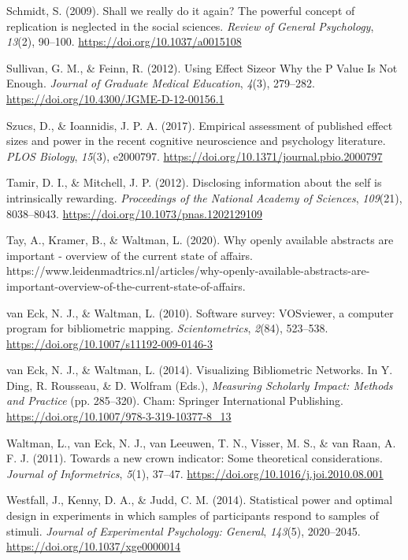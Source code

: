 \documentclass[
  man,floatsintext]{apa6}
\newlength{\cslhangindent}
\newlength{\cslentryspacingunit} %
\newenvironment{CSLReferences}[2] %
 {%
  \setlength{\parindent}{0pt}
  \ifodd #1
  \let\oldpar\par
  \def\par{\hangindent=\cslhangindent\oldpar}
  \fi
  \setlength{\parskip}{#2\cslentryspacingunit}
 }%
 {}
\begin{document}
\begin{CSLReferences}{1}{0}
\leavevmode{}%
Schmidt, S. (2009). Shall we really do it again? {The} powerful concept of replication is neglected in the social sciences. \emph{Review of General Psychology}, \emph{13}(2), 90--100. \url{https://doi.org/10.1037/a0015108}

\leavevmode{}%
Sullivan, G. M., \& Feinn, R. (2012). Using {Effect Size}\textemdash or {Why} the {P Value Is Not Enough}. \emph{Journal of Graduate Medical Education}, \emph{4}(3), 279--282. \url{https://doi.org/10.4300/JGME-D-12-00156.1}

\leavevmode{}%
Szucs, D., \& Ioannidis, J. P. A. (2017). Empirical assessment of published effect sizes and power in the recent cognitive neuroscience and psychology literature. \emph{PLOS Biology}, \emph{15}(3), e2000797. \url{https://doi.org/10.1371/journal.pbio.2000797}

\leavevmode{}%
Tamir, D. I., \& Mitchell, J. P. (2012). Disclosing information about the self is intrinsically rewarding. \emph{Proceedings of the National Academy of Sciences}, \emph{109}(21), 8038--8043. \url{https://doi.org/10.1073/pnas.1202129109}

\leavevmode{}%
Tay, A., Kramer, B., \& Waltman, L. (2020). Why openly available abstracts are important - overview of the current state of affairs. https://www.leidenmadtrics.nl/articles/why-openly-available-abstracts-are-important-overview-of-the-current-state-of-affairs.

\leavevmode{}%
van Eck, N. J., \& Waltman, L. (2010). Software survey: {VOSviewer}, a computer program for bibliometric mapping. \emph{Scientometrics}, \emph{2}(84), 523--538. \url{https://doi.org/10.1007/s11192-009-0146-3}

\leavevmode{}%
van Eck, N. J., \& Waltman, L. (2014). Visualizing {Bibliometric Networks}. In Y. Ding, R. Rousseau, \& D. Wolfram (Eds.), \emph{Measuring {Scholarly Impact}: {Methods} and {Practice}} (pp. 285--320). {Cham}: {Springer International Publishing}. \url{https://doi.org/10.1007/978-3-319-10377-8_13}

\leavevmode{}%
Waltman, L., van Eck, N. J., van Leeuwen, T. N., Visser, M. S., \& van Raan, A. F. J. (2011). Towards a new crown indicator: {Some} theoretical considerations. \emph{Journal of Informetrics}, \emph{5}(1), 37--47. \url{https://doi.org/10.1016/j.joi.2010.08.001}

\leavevmode{}%
Westfall, J., Kenny, D. A., \& Judd, C. M. (2014). Statistical power and optimal design in experiments in which samples of participants respond to samples of stimuli. \emph{Journal of Experimental Psychology: General}, \emph{143}(5), 2020--2045. \url{https://doi.org/10.1037/xge0000014}

\end{CSLReferences}
\end{document}
